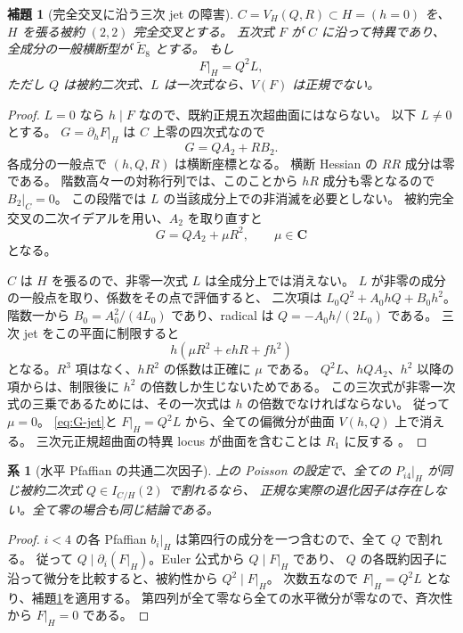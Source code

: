 \documentclass[11pt,a4paper]{ltjsarticle}
\newcommand{\CC}{\mathbf C}\newcommand{\QQ}{\mathbf Q}
\newtheorem{lemma}[theorem]{補題}
\newtheorem{corollary}[theorem]{系}
\theoremstyle{remark}\newtheorem{remark}[theorem]{注意}
\begin{document}
\begin{lemma}[完全交叉に沿う三次 jet の障害]\label{lem:jet}
$C=V_H(Q,R)\subset H=(h=0)$ を、$H$ を張る被約 $(2,2)$ 完全交叉とする。
五次式 $F$ が $C$ に沿って特異であり、全成分の一般横断型が $\widetilde E_8$ とする。
もし
\[
F|_H=Q^2L,
\]
ただし $Q$ は被約二次式、$L$ は一次式なら、$V(F)$ は正規でない。
\end{lemma}
\begin{proof}
$L=0$ なら $h\mid F$ なので、既約正規五次超曲面にはならない。
以下 $L\ne0$ とする。
$G=\partial_hF|_H$ は $C$ 上零の四次式なので
\[
G=QA_2+RB_2.
\]
各成分の一般点で $(h,Q,R)$ は横断座標となる。
横断 Hessian の $RR$ 成分は零である。
階数高々一の対称行列では、このことから $hR$ 成分も零となるので $B_2|_C=0$。
この段階では $L$ の当該成分上での非消滅を必要としない。
被約完全交叉の二次イデアルを用い、$A_2$ を取り直すと
\begin{equation}\label{eq:G-jet}
G=QA_2+\mu R^2,\qquad \mu\in\CC
\end{equation}
となる。

$C$ は $H$ を張るので、非零一次式 $L$ は全成分上では消えない。
$L$ が非零の成分の一般点を取り、係数をその点で評価すると、
二次項は $L_0Q^2+A_0hQ+B_0h^2$。
階数一から $B_0=A_0^2/(4L_0)$ であり、radical は
$Q=-A_0h/(2L_0)$ である。
三次 jet をこの平面に制限すると
\[
h(\mu R^2+e hR+f h^2)
\]
となる。$R^3$ 項はなく、$hR^2$ の係数は正確に $\mu$ である。
$Q^2L$、$hQA_2$、$h^2$ 以降の項からは、制限後に $h^2$ の倍数しか生じないためである。
この三次式が非零一次式の三乗であるためには、その一次式は $h$ の倍数でなければならない。
従って $\mu=0$。
\eqref{eq:G-jet}と $F|_H=Q^2L$ から、全ての偏微分が曲面 $V(h,Q)$ 上で消える。
三次元正規超曲面の特異 locus が曲面を含むことは $R_1$ に反する \cite{StacksNormal}。
\end{proof}

\begin{corollary}[水平 Pfaffian の共通二次因子]\label{cor:factor}
上の Poisson の設定で、全ての $P_{i4}|_H$ が同じ被約二次式 $Q\in I_{C/H}(2)$ で割れるなら、
正規な実際の退化因子は存在しない。全て零の場合も同じ結論である。
\end{corollary}
\begin{proof}
$i<4$ の各 Pfaffian $b_i|_H$ は第四行の成分を一つ含むので、全て $Q$ で割れる。
従って $Q\mid\partial_i(F|_H)$。Euler 公式から $Q\mid F|_H$ であり、
$Q$ の各既約因子に沿って微分を比較すると、被約性から $Q^2\mid F|_H$。
次数五なので $F|_H=Q^2L$ となり、補題\ref{lem:jet}を適用する。
第四列が全て零なら全ての水平微分が零なので、斉次性から $F|_H=0$ である。
\end{proof}
\end{document}
